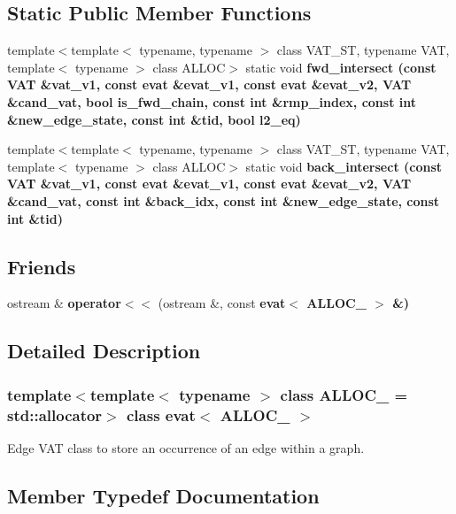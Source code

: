 \subsection*{Static Public Member Functions}
\begin{CompactItemize}
\item 
template$<$template$<$ typename, typename $>$ class VAT\_\-ST, typename VAT, template$<$ typename $>$ class ALLOC$>$ static void \bf{fwd\_\-intersect} (const VAT \&vat\_\-v1, const \bf{evat} \&evat\_\-v1, const \bf{evat} \&evat\_\-v2, VAT \&cand\_\-vat, bool is\_\-fwd\_\-chain, const int \&rmp\_\-index, const int \&new\_\-edge\_\-state, const int \&tid, bool l2\_\-eq)
\item 
template$<$template$<$ typename, typename $>$ class VAT\_\-ST, typename VAT, template$<$ typename $>$ class ALLOC$>$ static void \bf{back\_\-intersect} (const VAT \&vat\_\-v1, const \bf{evat} \&evat\_\-v1, const \bf{evat} \&evat\_\-v2, VAT \&cand\_\-vat, const int \&back\_\-idx, const int \&new\_\-edge\_\-state, const int \&tid)
\end{CompactItemize}
\subsection*{Friends}
\begin{CompactItemize}
\item 
ostream \& \textbf{operator$<$$<$} (ostream \&, const \bf{evat}$<$ ALLOC\_\- $>$ \&)\label{classevat_f5b44c5fa629bb0bfac69e3f6e791f23}

\end{CompactItemize}


\subsection{Detailed Description}
\subsubsection*{template$<$template$<$ typename $>$ class ALLOC\_\- = std::allocator$>$ class evat$<$ ALLOC\_\- $>$}

Edge VAT class to store an occurrence of an edge within a graph. 



\subsection{Member Typedef Documentation}
